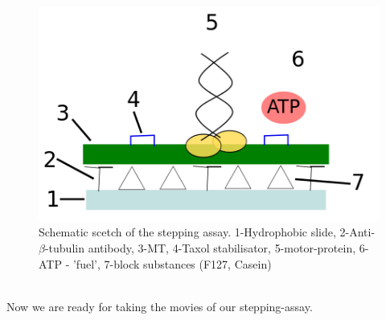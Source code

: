  		\begin{figure}[H]
 			\centering
 		   	\captionsetup{justification=raggedright, margin =4cm}            
 		    	  \includegraphics[scale=0.3]{pic/steppingassay.png}
 		    \caption{Schematic scetch of the stepping assay. 1-Hydrophobic slide, 2-Anti-$\beta$-tubulin antibody, 3-MT, 4-Taxol stabilisator, 5-motor-protein, 6-ATP - 'fuel', 7-block substances (F127, Casein)}
 		   	\label{exp:steppingAssay} 
 		\end{figure}
 		\ \\
 		Now we are ready for taking the movies of our stepping-assay.
    	     	                 
    	 

